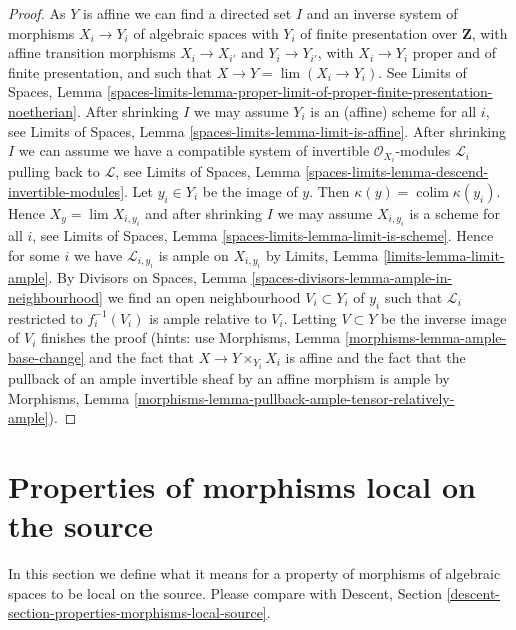 \documentclass{stacks-project}
\theoremstyle{plain}
\theoremstyle{definition}
\theoremstyle{remark}
\numberwithin{equation}{subsection}
\def\lim{\mathop{\mathrm{lim}}\nolimits}
\def\colim{\mathop{\mathrm{colim}}\nolimits}
\begin{document}
\begin{proof}
\medskip\noindent
As $Y$ is affine we can find a directed set $I$ and an
inverse system of morphisms $X_i \to Y_i$ of algebraic spaces
with $Y_i$ of finite presentation over $\mathbf{Z}$, with affine
transition morphisms $X_i \to X_{i'}$ and $Y_i \to Y_{i'}$,
with $X_i \to Y_i$ proper and of finite presentation, and such that
$X \to Y = \lim (X_i \to Y_i)$. See Limits of Spaces, Lemma
\ref{spaces-limits-lemma-proper-limit-of-proper-finite-presentation-noetherian}.
After shrinking $I$ we may assume $Y_i$ is an (affine) scheme for all $i$,
see Limits of Spaces, Lemma \ref{spaces-limits-lemma-limit-is-affine}.
After shrinking $I$ we can assume we have a compatible system of
invertible $\mathcal{O}_{X_i}$-modules $\mathcal{L}_i$
pulling back to $\mathcal{L}$, see
Limits of Spaces, Lemma \ref{spaces-limits-lemma-descend-invertible-modules}.
Let $y_i \in Y_i$ be the image of $y$.
Then $\kappa(y) = \colim \kappa(y_i)$.
Hence $X_y = \lim X_{i, y_i}$ and after shrinking $I$ we
may assume $X_{i, y_i}$ is a scheme for all $i$, see
Limits of Spaces, Lemma \ref{spaces-limits-lemma-limit-is-scheme}.
Hence for some $i$ we have $\mathcal{L}_{i, y_i}$
is ample on $X_{i, y_i}$ by
Limits, Lemma \ref{limits-lemma-limit-ample}.
By Divisors on Spaces, Lemma \ref{spaces-divisors-lemma-ample-in-neighbourhood}
we find an open neighbourhood
$V_i \subset Y_i$ of $y_i$ such that
$\mathcal{L}_i$ restricted to $f_i^{-1}(V_i)$
is ample relative to $V_i$.
Letting $V \subset Y$ be the inverse image of
$V_i$ finishes the proof (hints: use
Morphisms, Lemma \ref{morphisms-lemma-ample-base-change} and
the fact that $X \to Y \times_{Y_i} X_i$ is affine
and the fact that the pullback of an
ample invertible sheaf by an affine morphism is ample by
Morphisms, Lemma \ref{morphisms-lemma-pullback-ample-tensor-relatively-ample}).
\end{proof}













\section{Properties of morphisms local on the source}
\label{section-properties-morphisms-local-source}

\noindent
In this section we define what it means for a property of morphisms of
algebraic spaces to be local on the source. Please compare with
Descent, Section \ref{descent-section-properties-morphisms-local-source}.
\end{document}
